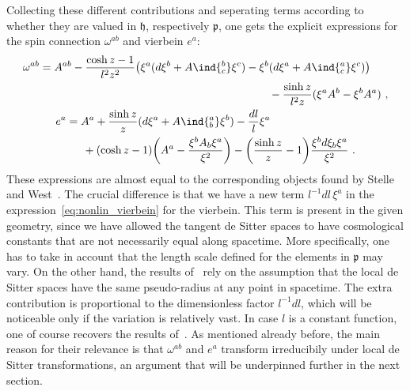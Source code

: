 \documentclass[11pt]{article}
\begin{document}
Collecting these different contributions and seperating terms 
according to whether they are valued in $\mathfrak{h}$, 
respectively $\mathfrak{p}$, one gets the explicit expressions 
for the spin connection $\omega^{ab}$ and vierbein $e^a$:
\begin{subequations}
\label{eqs:nonlin_spin_vier}
\begin{gather}
\label{eq:nonlin_spinconn}
\begin{multlined}[b][\linewidth-8\multlinegap]
	\omega^{ab} = A^{ab} - \frac{\cosh z - 1}{l^2 z^2} \big( \xi^a 
	(d\xi^b + A\ind{^b_c} \xi^c) - \xi^b (d\xi^a + A\ind{^a_c} 
	\xi^c) \big) \\
	- \frac{\sinh z}{l^2 z} (\xi^a A^b - \xi^b A^a)
\end{multlined}~,
\\
\label{eq:nonlin_vierbein}
\begin{multlined}[b][\linewidth-8\multlinegap]
	e^a = A^a + \frac{\sinh z}{z}( d\xi^a + A\ind{^a_b} \xi^b) - 
	\frac{dl}{l} \xi ^a \\
	+ (\cosh z - 1) \bigg( A^a - \frac{\xi^b A_b \xi^a}{\xi^2} 
	\bigg) - \bigg( \frac{\sinh z}{z} - 1 \bigg) \frac{\xi^b 
		d\xi_b \xi^a}{\xi^2}
\end{multlined}~.
\end{gather}
\end{subequations}
These expressions are almost equal to the corresponding objects 
found by Stelle and West~\cite{stelle.west:1980ds}. The crucial 
difference is that we have a new term $l^{-1} dl\,\xi^a$ in the 
expression~\eqref{eq:nonlin_vierbein} for the vierbein. This term 
is present in the given geometry, since we have allowed the 
tangent de Sitter spaces to have cosmological constants that are 
not necessarily equal along spacetime. More specifically, one has 
to take in account that the length scale defined for the elements 
in $\mathfrak{p}$ may vary. On the other hand, the results 
of~\cite{stelle.west:1980ds} rely on the assumption that the 
local de Sitter spaces have the same pseudo-radius at any point 
in spacetime. The extra contribution is proportional to the 
dimensionless factor $l^{-1} d l$, which will be noticeable only 
if the variation is relatively vast. In case $l$ is a constant 
function, one of course recovers the results 
of~\cite{stelle.west:1980ds}.
As mentioned already before, the main reason for their relevance 
is that $\omega^{ab}$ and $e^a$ transform irreducibily under 
local de Sitter transformations, an argument that will be 
underpinned further in the next section.  
\end{document}
